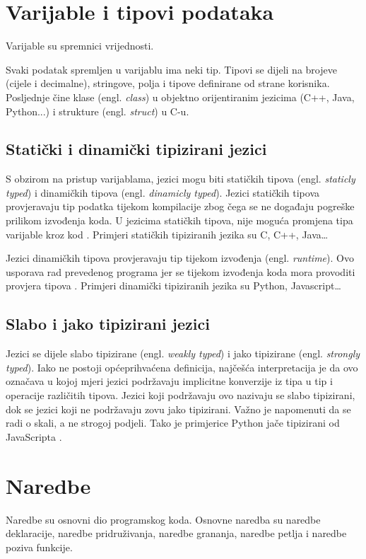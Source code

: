 \documentclass[times, utf8, zavrsni]{fer}
\begin{document}
\section{Varijable i tipovi podataka}
Varijable su spremnici vrijednosti.

Svaki podatak spremljen u varijablu ima neki tip. Tipovi se dijeli na brojeve (cijele i decimalne), stringove, polja i tipove definirane od strane korisnika. Posljednje
čine klase (engl. \textit{class}) u objektno orijentiranim jezicima (C++, Java, Python...) i strukture (engl. \textit{struct}) u C-u.

\subsection{Statički i dinamički tipizirani jezici}
S obzirom na pristup varijablama, jezici mogu biti statičkih tipova (engl. \textit{staticly typed}) i dinamičkih tipova (engl. \textit{dinamicly typed}).
Jezici statičkih tipova provjeravaju tip podatka tijekom kompilacije zbog čega se ne događaju pogreške prilikom izvođenja koda. U jezicima statičkih tipova, nije moguća promjena tipa 
varijable kroz kod \citep{pythonplanet}. Primjeri statičkih tipiziranih jezika su C, C++, Java\dots

Jezici dinamičkih tipova provjeravaju tip tijekom izvođenja (engl. \textit{runtime}). Ovo usporava rad prevedenog programa jer se tijekom izvođenja koda mora provoditi provjera tipova \citep{pythonplanet}.
Primjeri dinamički tipiziranih jezika su Python, Javascript\dots

\subsection{Slabo i jako tipizirani jezici}
Jezici se dijele slabo tipizirane (engl. \textit{weakly typed}) i jako tipizirane (engl. \textit{strongly typed}). Iako ne postoji općeprihvaćena definicija, 
najčešća interpretacija je da ovo označava u kojoj mjeri jezici podržavaju implicitne konverzije iz tipa u tip i operacije različitih tipova. Jezici koji podržavaju ovo nazivaju
se slabo tipizirani, dok se jezici koji ne podržavaju zovu jako tipizirani. Važno je napomenuti da se radi o skali, a ne strogoj podjeli. Tako je primjerice Python jače tipizirani od JavaScripta \citep{zolatypes}. 

\section{Naredbe}
Naredbe su osnovni dio programskog koda. Osnovne naredba su naredbe deklaracije, naredbe pridruživanja, naredbe grananja, naredbe petlja i naredbe poziva funkcije.
\end{document}
